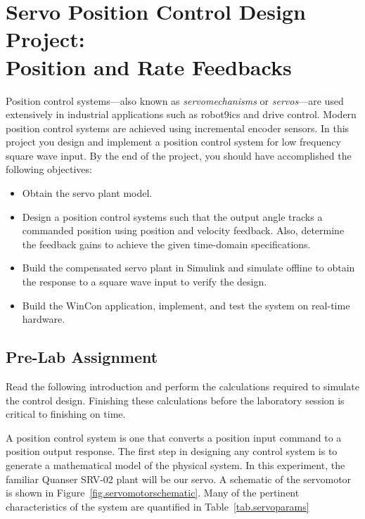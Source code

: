
\newcommand{\circscale}{0.25}


\chapter[Servo Position Control: Position \& Rate Feedbacks]{Servo Position Control Design Project:\\ Position and Rate Feedbacks} \label{ch.PosCon}

Position control systems---also known as \textit{servomechanisms} or \textit{servos}---are used extensively in industrial applications such as robot9ics and drive control.  Modern position control systems are achieved using incremental encoder sensors.  In this project you design and implement a position control system for low frequency square wave input.  By the end of the project, you should have accomplished the following objectives:
\begin{itemize}
\item
    Obtain the servo plant model.
\item
    Design a position control systems such that the output angle tracks a commanded position using position and velocity feedback.  Also, determine the feedback gains to achieve the given time-domain specifications.
\item
    Build the compensated servo plant in Simulink and simulate offline to obtain the response to a square wave input to verify the design.
\item
    Build the WinCon application, implement, and test the system on real-time hardware.
\end{itemize}

\section{Pre-Lab Assignment}

Read the following introduction and perform the calculations required to simulate the control design.  Finishing these calculations before the laboratory session is critical to finishing on time.
\par
A position control system is one that converts a position input command to a position output response.  The first step in designing any control system is to generate a mathematical model of the physical system.  In this experiment, the familiar Quanser SRV-02 plant will be our servo.  A schematic of the servomotor is shown in Figure~\ref{fig.servomotorschematic}.  Many of the pertinent characteristics of the system are quantified in Table~\ref{tab.servoparams}

